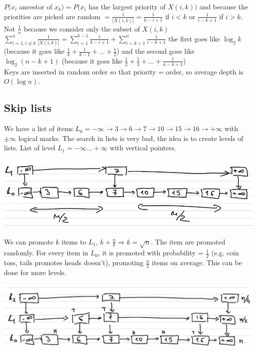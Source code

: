 \documentclass[10pt]{report}
\begin{document}
$P(x_i$ ancestor of $x_k) = P(x_i$ has the largest priority of $X(i,k))$ and because the priorities are picked are random $= \frac{1}{|X(i,k)|} = \frac{1}{k - i + 1}$ if $i < k$ or $\frac{1}{i - k + 1}$ if $i > k$. Not $\frac{1}{n}$ because we consider only the subset of $X(i,k)$\\
$\sum_{i=1, i\neq k}^n \frac{1}{|X(i,k)|} = \sum_{i = 1}^{k-1} \frac{1}{k-i + 1} + \sum_{i = k+1}^n \frac{1}{i - k + 1}$ the first goes like $\log_2 k$ (because it goes like $\frac{1}{k} + \frac{1}{k-1} + \ldots + \frac{1}{2}$) and the second goes like $\log_2 (n - k + 1)$ (because it goes like $\frac{1}{2} + \frac{1}{3} + \ldots + \frac{1}{n-k+1}$)\\
Keys are inserted in random order so that priority = order, so average depth is $O(\log n)$.
\subsection{Skip lists} We have a list of items $L_0 = -\infty \rightarrow 3 \rightarrow 6 \rightarrow 7 \rightarrow 10 \rightarrow 15 \rightarrow 16 \rightarrow +\infty$ with $\pm\infty$ logical marks. The search in lists is very bad, the idea is to create levels of lists. List of level $L_1 = -\infty \ldots +\infty$ with vertical pointers.
\begin{center}
	\includegraphics[scale=0.5]{5.png}
\end{center}
We can promote $k$ items to $L_1$, $k + \frac{n}{k} \Rightarrow k = \sqrt{n}$. The item are promoted randomly. For every item in $L_0$, it is promoted with probability = $\frac{1}{2}$ (e.g. coin toss, tails promotes heads doesn't), promoting $\frac{n}{2}$ items on average. This can be done for more levels.
\begin{center}
	\includegraphics[scale=0.5]{6.png}
\end{center}
\end{document}
